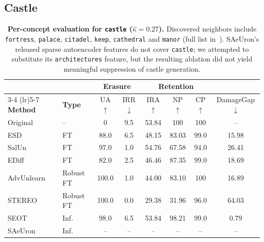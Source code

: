 \subsection{Castle}
\label{app:per_concept_castle}

\begin{table}[ht]
\centering
\small
\setlength{\tabcolsep}{5pt}
\begin{tabular}{llcccccc}
\toprule
& & \multicolumn{2}{c}{\textbf{Erasure}} & \multicolumn{3}{c}{\textbf{Retention}} & \\
\cmidrule(lr){3-4} \cmidrule(lr){5-7}
\textbf{Method} & \textbf{Type} & UA$\uparrow$ & IRR$\downarrow$ & IRA$\uparrow$ & NP$\uparrow$ & CP$\uparrow$ & DamageGap$\downarrow$ \\
\midrule
Original    & --          & 0     & 9.5   & 53.84 & 100   & 100   & --    \\
\midrule
ESD         & FT          & 88.0  & 6.5   & 48.15 & 83.03 & 99.0  & 15.98 \\
SalUn       & FT          & 97.0  & 1.0   & 54.76 & 67.58 & 94.0  & 26.41 \\
EDiff       & FT          & 82.0  & 2.5   & 46.46 & 87.35 & 99.0  & 18.69 \\
\midrule
AdvUnlearn  & Robust FT   & 100.0 & 1.0   & 44.00 & 83.10 & 100   & 16.89 \\
STEREO      & Robust FT   & 100.0 & 0.0   & 29.38 & 31.96 & 96.0  & 64.03 \\
\midrule
SEOT        & Inf.        & 98.0  & 6.5   & 53.84 & 98.21 & 99.0  & 0.79  \\
SAeUron     & Inf.        & --    & --    & --    & --    & --    & --    \\
\bottomrule
\end{tabular}
\caption{\textbf{Per-concept evaluation for \texttt{castle} ($\hat\kappa = 0.27$).} Discovered neighbors include 
\texttt{fortress}, \texttt{palace}, \texttt{citadel}, \texttt{keep}, \texttt{cathedral} and \texttt{manor} (full list in~). SAeUron's released sparse autoencoder features do not cover \texttt{castle}; we attempted to substitute its \texttt{architectures} feature, but the resulting ablation did not yield meaningful suppression of castle generation.}
\label{tab:per_concept_castle}
\end{table}

